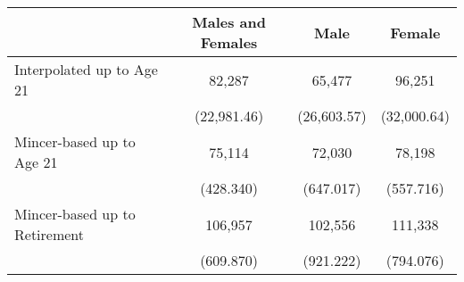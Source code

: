 \begin{tabular}{lccc} \toprule
 & Males and Females  & Male  & Female  \\  \midrule
 Interpolated up to Age 21 & 82,287 & 65,477 & 96,251 \\
 & (22,981.46) & (26,603.57) & (32,000.64) \\
Mincer-based up to Age 21 &  75,114 &  72,030 &  78,198 \\  
 & (428.340) & (647.017) & (557.716) \\  
Mincer-based up to Retirement &  106,957 &  102,556 &  111,338 \\  
 & (609.870) & (921.222) & (794.076) \\  
\bottomrule \end{tabular} 
